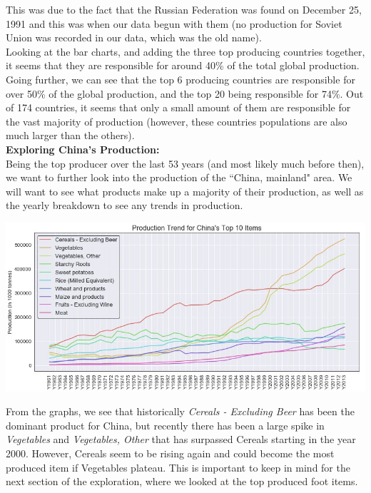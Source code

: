 \documentclass[12pt, a4paper]{article}
\begin{document}
\begin{spacing}{1.1}
	
	\noindent This was due to the fact that the Russian Federation was found on December 25, 1991 and this was when our data begun with them (no production for Soviet Union was recorded in our data, which was the old name).\vspace*{2mm}\\
	Looking at the bar charts, and adding the three top producing countries together, it seems that they are responsible for around 40\% of the total global production. Going further, we can see that the top 6 producing countries are responsible for over 50\% of the global production, and the top 20 being responsible for 74\%. Out of 174 countries, it seems that only a small amount of them are responsible for the vast majority of production (however, these countries populations are also much larger than the others). \vspace*{6mm}\\
	\textbf{Exploring China's Production:}\\
	Being the top producer over the last 53 years (and most likely much before then), we want to further look into the production of the ``China, mainland" area. We will want to see what products make up a majority of their production, as well as the yearly breakdown to see any trends in production.
	\begin{center}
	\includegraphics[scale=.65]{china_prod} 
	\end{center}
	From the graphs, we see that historically \textit{Cereals - Excluding Beer} has been the dominant product for China, but recently there has been a large spike in \textit{Vegetables} and \textit{Vegetables, Other} that has surpassed Cereals starting in the year 2000. However, Cereals seem to be rising again and could become the most produced item if Vegetables plateau. This is important to keep in mind for the next section of the exploration, where we looked at the top produced foot items. \newpage
	

\end{spacing}
\end{document}
